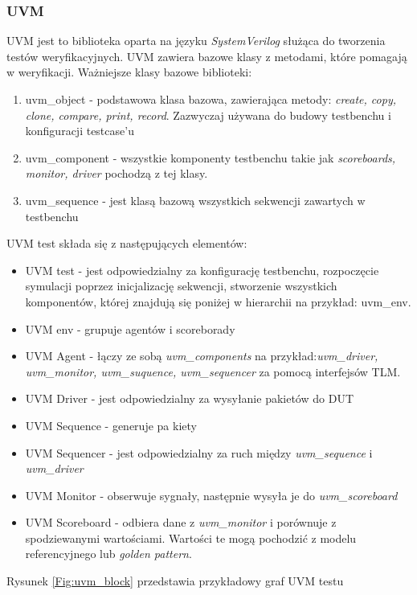 \documentclass[11pt,a4paper]{article}
\begin{document}
		\subsubsection{UVM}
		\hspace{5mm}
			UVM jest to biblioteka oparta na języku \textit{SystemVerilog} służąca do tworzenia testów weryfikacyjnych. UVM zawiera bazowe klasy z metodami, które pomagają w weryfikacji. Ważniejsze klasy bazowe biblioteki:
			\begin{enumerate}
				\item uvm\_object - podstawowa klasa bazowa, zawierająca metody: \textit{create, copy, clone, compare, print, record}. Zazwyczaj używana do budowy testbenchu i konfiguracji testcase'u
				\item uvm\_component - wszystkie komponenty testbenchu takie jak \textit{scoreboards, monitor, driver} pochodzą z tej klasy.
				\item uvm\_sequence - jest klasą bazową wszystkich sekwencji zawartych w testbenchu
			\end{enumerate}
UVM test składa się z następujących elementów:
\begin{itemize}
	\item UVM test - jest odpowiedzialny za konfigurację testbenchu, rozpoczęcie symulacji poprzez inicjalizację sekwencji, stworzenie wszystkich komponentów, której znajdują się poniżej w hierarchii na przykład: uvm\_env.
	\item UVM env - grupuje agentów i scoreborady
	\item UVM Agent - łączy ze sobą \textit{uvm\_components} na przykład:\textit{uvm\_driver, uvm\_monitor, uvm\_suquence, uvm\_sequencer} za pomocą interfejsów TLM.
	\item UVM Driver - jest odpowiedzialny za wysyłanie pakietów do DUT
	\item UVM Sequence - generuje pa kiety
	\item UVM Sequencer - jest odpowiedzialny za ruch między \textit{uvm\_sequence} i \textit{uvm\_driver}
	\item UVM Monitor - obserwuje sygnały, następnie wysyła je do \textit{uvm\_scoreboard}
	\item UVM Scoreboard - odbiera dane z \textit{uvm\_monitor} i porównuje z spodziewanymi wartościami. Wartości te mogą pochodzić z modelu referencyjnego lub \textit{golden pattern}.
\end{itemize}
		Rysunek \ref{Fig:uvm_block} przedstawia przykładowy graf UVM testu
\end{document}
